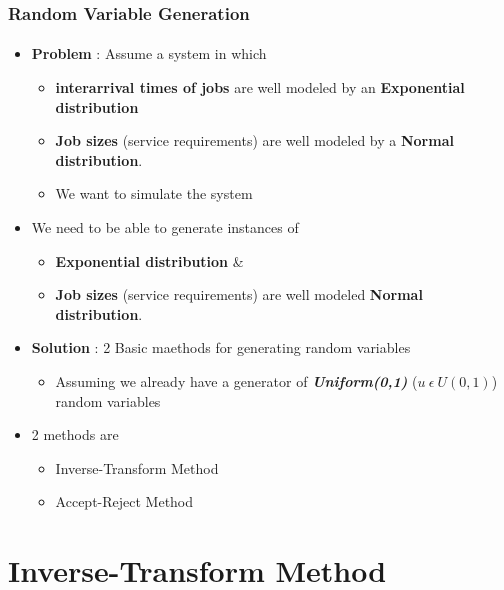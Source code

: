 \documentclass{beamer}
\begin{document}
\begin{frame}
    \frametitle{Random Variable Generation}
    \framesubtitle{\textbf{\textit{}}}
	\begin{itemize}
	
		\item \textbf{Problem} : Assume a system in which  
			\begin{itemize}
			\item \textbf{interarrival times of jobs }are well modeled by an
						\textbf{Exponential distribution } 
			\item \textbf{Job sizes} (service requirements) are well modeled
					by a \textbf{Normal distribution}.
			\item We want to simulate the system 
			\end{itemize}
		\item We need to be able to generate instances of 
			\begin{itemize}
			\item \textbf{Exponential distribution }  \&
			\item \textbf{Job sizes} (service requirements) are well modeled
				\textbf{Normal distribution}.
			\end{itemize}
		\item \textbf{Solution } : 2 Basic maethods for generating random 						variables
			\begin{itemize}
			\item Assuming we already have a generator of 										\textbf{\textit{Uniform(0,1)}} ($u \: \epsilon \: U(0,1)$) 
			random variables 
			\end{itemize}
		\item 2 methods are
			\begin{itemize}
				\item Inverse-Transform Method
				\item Accept-Reject Method

			\end{itemize}
		  
	\end{itemize}	    
    
\end{frame}

\section{Inverse-Transform Method}
\end{document}
